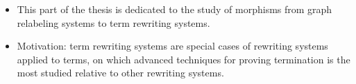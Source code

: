 \begin{itemize}
    \item This part of the thesis is dedicated to the study of morphisms from graph relabeling systems to term rewriting systems.
    \item Motivation: term rewriting systems are special cases of rewriting systems applied to terms, on which advanced techniques for proving termination is the most studied relative to other rewriting systems.
\end{itemize} 
